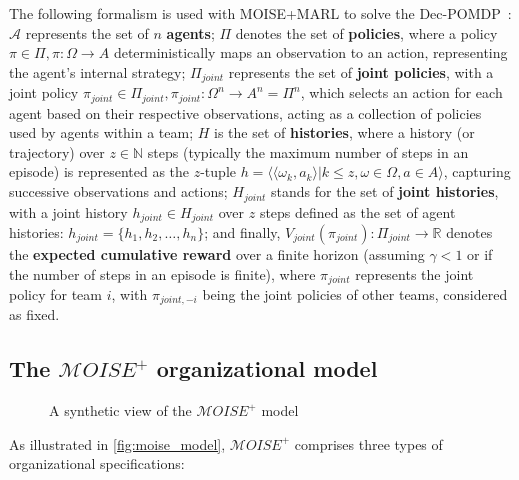 \documentclass[sigconf]{aamas}
\begin{document}
The following formalism is used with MOISE+MARL to solve the Dec-POMDP~\cite{Beynier2013,Albrecht2024}: $\mathcal{A}$ represents the set of $n$ \textbf{agents}; $\Pi$ denotes the set of \textbf{policies}, where a policy $\pi \in \Pi, \pi: \Omega \rightarrow A$ deterministically maps an observation to an action, representing the agent's internal strategy; $\Pi_{joint}$ represents the set of \textbf{joint policies}, with a joint policy $\pi_{joint} \in \Pi_{joint}, \pi_{joint}: \Omega^n \rightarrow A^n = \Pi^n$, which selects an action for each agent based on their respective observations, acting as a collection of policies used by agents within a team; $H$ is the set of \textbf{histories}, where a history (or trajectory) over $z \in \mathbb{N}$ steps (typically the maximum number of steps in an episode) is represented as the $z$-tuple $h = \langle \langle \omega_{k}, a_{k}\rangle | k \leq z, \omega \in \Omega, a \in A\rangle$, capturing successive observations and actions; $H_{joint}$ stands for the set of \textbf{joint histories}, with a joint history $h_{joint} \in H_{joint}$ over $z$ steps defined as the set of agent histories: $h_{joint} = \{h_1, h_2, \dots, h_n\}$; and finally, $V_{joint}(\pi_{joint}): \Pi_{joint} \rightarrow \mathbb{R}$ denotes the \textbf{expected cumulative reward} over a finite horizon (assuming $\gamma < 1$ or if the number of steps in an episode is finite), where $\pi_{joint}$ represents the joint policy for team $i$, with $\pi_{joint,-i}$ being the joint policies of other teams, considered as fixed.



\subsection{The $\mathcal{M}OISE^+$ organizational model}

\begin{figure}[h!]
    
    \caption{A synthetic view of the $\mathcal{M}OISE^+$ model}
    \label{fig:moise_model}
\end{figure}

As illustrated in \autoref{fig:moise_model}, $\mathcal{M}OISE^+$ comprises three types of organizational specifications:
\end{document}
